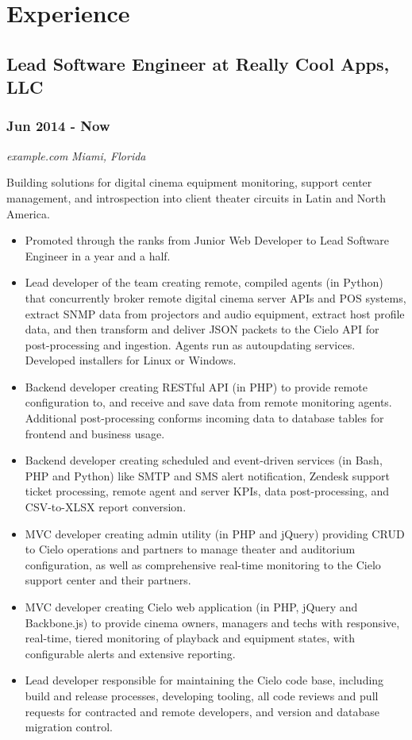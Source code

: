 \documentclass[letterpaper]{article}
\begin{document}
\section{Experience}
\label{sec-3}

\subsection{Lead Software Engineer at Really Cool Apps, LLC}
\label{sec-3-1}
\subsubsection{Jun 2014 - Now}
\label{sec-3-1-1}
\emph{example.com} \hfill \emph{Miami, Florida}\\
\vspace{0.1in}

Building solutions for digital cinema equipment monitoring, support center management, and introspection into client theater circuits in Latin and North America.\\
\vspace{0.1in}

\begin{itemize}
\item Promoted through the ranks from Junior Web Developer to Lead Software Engineer in a year and a half.
\item Lead developer of the team creating remote, compiled agents (in Python) that concurrently broker remote digital cinema server APIs and POS systems, extract SNMP data from projectors and audio equipment, extract host profile data, and then transform and deliver JSON packets to the Cielo API for post-processing and ingestion. Agents run as autoupdating services. Developed installers for Linux or Windows.
\item Backend developer creating RESTful API (in PHP) to provide remote configuration to, and receive and save data from remote monitoring agents. Additional post-processing conforms incoming data to database tables for frontend and business usage.
\item Backend developer creating scheduled and event-driven services (in Bash, PHP and Python) like SMTP and SMS alert notification, Zendesk support ticket processing, remote agent and server KPIs, data post-processing, and CSV-to-XLSX report conversion.
\item MVC developer creating admin utility (in PHP and jQuery) providing CRUD to Cielo operations and partners to manage theater and auditorium configuration, as well as comprehensive real-time monitoring to the Cielo support center and their partners.
\item MVC developer creating Cielo web application (in PHP, jQuery and Backbone.js) to provide cinema owners, managers and techs with responsive, real-time, tiered monitoring of playback and equipment states, with configurable alerts and extensive reporting.
\item Lead developer responsible for maintaining the Cielo code base, including build and release processes, developing tooling, all code reviews and pull requests for contracted and remote developers, and version and database migration control.
\end{itemize}
\end{document}
